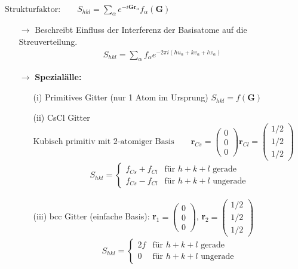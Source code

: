 \begin{itemize}
\begin{align*}
    \end{align*}
    $\text{Strukturfaktor:} \qquad S_{hkl} = \sum_{\alpha} e^{-i \textbf{G} \textbf{r}_{\alpha}} f_{\alpha} (\textbf{G})$
        \begin{itemize}
        \item[$\rightarrow$] Beschreibt Einfluss der Interferenz der Basisatome auf die Streuverteilung.
        \begin{align*}
            S_{hkl} = \sum_\alpha f_\alpha e^{-2\pi i (hu_\alpha+kv_\alpha+lw_\alpha)}
        \end{align*}
        \item[$\rightarrow$] \textbf{Spezialälle:}
        \begin{itemize}
            \item[(i)] Primitives Gitter (nur 1 Atom im Ursprung) $S_{hkl}=f(\textbf{G})$
            \item[(ii)] CsCl Gitter\\ $\text{Kubisch primitiv mit 2-atomiger Basis} \qquad \textbf{r}_{Cs}= \left(\begin{array}{c} 0 \\ 0 \\ 0 \end{array}\right) \textbf{r}_{Cl} = \left(\begin{array}{c} 1/2 \\ 1/2 \\ 1/2 \end{array}\right)$ 
            \begin{align*}
                S_{hkl} = \begin{cases}
                    f_{Cs} + f_{Cl} & \text{für $h+k+l$ gerade}\\
                    f_{Cs} - f_{Cl} & \text{für $h+k+l$ ungerade}
                \end{cases}
            \end{align*}

            \item[(iii)] bcc Gitter (einfache Basis): \textbf{r}$_1 = \left(\begin{array}{c} 0 \\ 0 \\ 0 \end{array}\right)$, \textbf{r}$_2 = \left(\begin{array}{c} 1/2 \\ 1/2 \\ 1/2 \end{array}\right)$
            \begin{align*}
                S_{hkl} = \begin{cases}
                    2f & \text{für $h+k+l$ gerade}\\
                    0 & \text{für $h+k+l$ ungerade}
                \end{cases}
            \end{align*}


\end{itemize}
\end{itemize}
\end{itemize}
